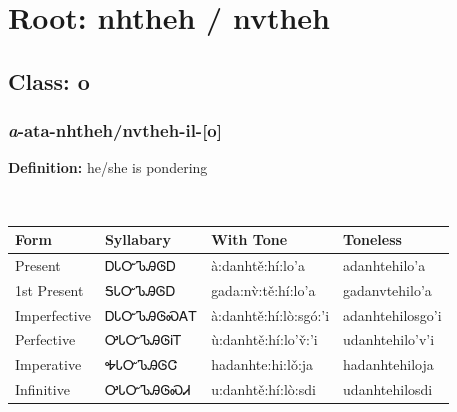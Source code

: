 \needspace{4in}
\section*{Root: nhtheh / nvtheh}
\nopagebreak
{}
\needspace{3in}
\subsection*{Class: o}
\nopagebreak
\needspace{2in}
\subsubsection*{\textit{a}{-}ata{-}\textbf{nhtheh/nvtheh}{-}il{-}[o]}
\nopagebreak
\textbf{Definition: } he/she is pondering
\\[0.5em]
\begin{tabularx}{\textwidth}{l X X X}%
\toprule%
\textbf{Form}&\textbf{Syllabary}&\textbf{With Tone}&\textbf{Toneless}\\%
\midrule%
Present&ᎠᏓᏅᏖᎯᎶᎠ&à:danhtě:hí:lo’a&adanhtehilo’a\\%
1st Present&ᎦᏓᏅᏖᎯᎶᎠ&gada:nv̀:tě:hí:lo’a&gadanvtehilo’a\\%
Imperfective&ᎠᏓᏅᏖᎯᎶᏍᎪᎢ&à:danhtě:hí:lò:sgó:’i&adanhtehilosgo’i\\%
Perfective&ᎤᏓᏅᏖᎯᎶᎥᎢ&ù:danhtě:hí:lo’v̌:’i&udanhtehilo’v’i\\%
Imperative&ᎭᏓᏅᏖᎯᎶᏣ&hadanhte:hi:lǒ:ja&hadanhtehiloja\\%
Infinitive&ᎤᏓᏅᏖᎯᎶᏍᏗ&u:danhtě:hí:lò:sdi&udanhtehilosdi\\%
\bottomrule%
\end{tabularx}
\\[1em]